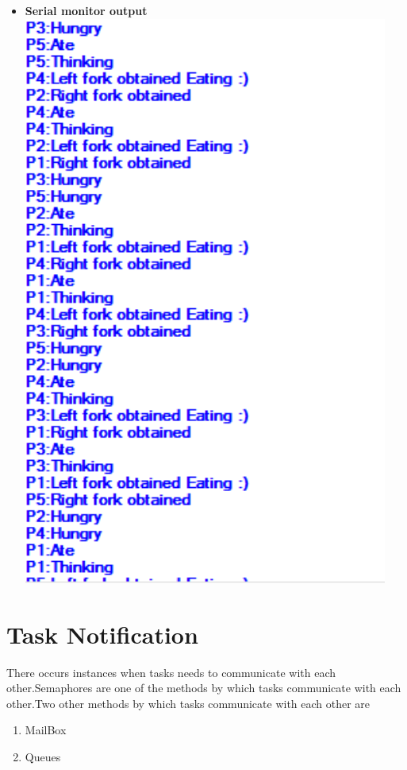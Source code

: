 \documentclass[11pt,a4paper]{article}
\begin{document}
\begin{itemize}
	
	\newpage
	\item \textbf{Serial monitor output}
	\\
	\includegraphics[width=12cm]{cont}
\end{itemize}
\newpage


\section{Task Notification}
	There occurs instances when tasks needs to communicate with each other.Semaphores are one of the methods by which tasks communicate with each other.Two other methods by which tasks communicate with each other are 
	\begin{enumerate}
		\item MailBox
		\item Queues
	\end{enumerate}
	
\end{document}
